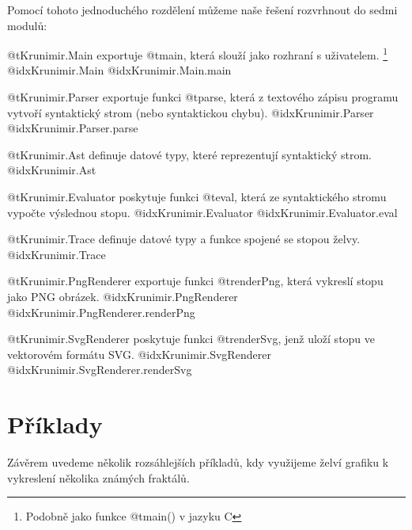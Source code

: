 Pomocí tohoto jednoduchého rozdělení můžeme naše řešení rozvrhnout do sedmi
modulů:

\begin{description}

\item @t{Krunimir.Main} exportuje @t{main}, která slouží jako rozhraní s
uživatelem. \footnote{Podobně jako funkce @t{main()} v jazyku C}
  @idx{Krunimir.Main}
  @idx{Krunimir.Main.main}

\item @t{Krunimir.Parser} exportuje funkci @t{parse}, která z textového
zápisu programu vytvoří syntaktický strom (nebo syntaktickou chybu).
  @idx{Krunimir.Parser}
  @idx{Krunimir.Parser.parse}

\item @t{Krunimir.Ast} definuje datové typy, které reprezentují syntaktický
strom.
  @idx{Krunimir.Ast}

\item @t{Krunimir.Evaluator} poskytuje funkci @t{eval}, která ze
syntaktického stromu vypočte výslednou stopu.
  @idx{Krunimir.Evaluator}
  @idx{Krunimir.Evaluator.eval}

\item @t{Krunimir.Trace} definuje datové typy a funkce spojené se stopou želvy.
  @idx{Krunimir.Trace}

\item @t{Krunimir.PngRenderer} exportuje funkci @t{renderPng}, která vykreslí
  stopu jako PNG obrázek.
  @idx{Krunimir.PngRenderer}
  @idx{Krunimir.PngRenderer.renderPng}

\item @t{Krunimir.SvgRenderer} poskytuje funkci @t{renderSvg}, jenž uloží stopu
  ve vektorovém formátu SVG.
  @idx{Krunimir.SvgRenderer}
  @idx{Krunimir.SvgRenderer.renderSvg}

\end{description}









\section{Příklady}

Závěrem uvedeme několik rozsáhlejších příkladů, kdy využijeme želví grafiku k
vykreslení několika známých fraktálů. 

